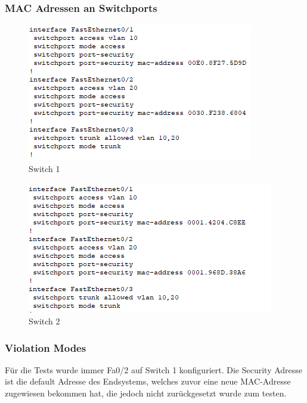 \subsubsection{MAC Adressen an Switchports}
\begin{figure}[!htb]
    \centering
    \includegraphics[width=.95\textwidth,height=.5\textwidth,keepaspectratio]{./img/config/mac-static/S1.png}
    \caption{Switch 1}
\end{figure}
\begin{figure}[!htb]
    \centering
    \includegraphics[width=.95\textwidth,height=.5\textwidth,keepaspectratio]{./img/config/mac-static/S2.png}
    \caption{Switch 2}
\end{figure}
\FloatBarrier
\subsubsection{Violation Modes}
Für die Tests wurde immer Fa0/2 auf Switch 1 konfiguriert. Die Security Adresse ist die default Adresse des Endsystems, welches zuvor eine neue MAC-Adresse zugewiesen bekommen hat, die jedoch nicht zurückgesetzt wurde zum testen.

